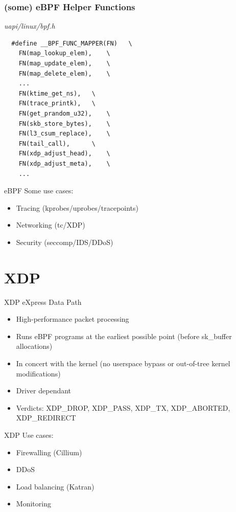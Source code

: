 \documentclass{beamer}
\begin{document}
\begin{frame}[fragile]
  \frametitle{(some) eBPF Helper Functions}
  \textit{uapi/linux/bpf.h~}
  \begin{verbatim}
  #define __BPF_FUNC_MAPPER(FN)   \
    FN(map_lookup_elem),    \
    FN(map_update_elem),    \
    FN(map_delete_elem),    \
    ...
    FN(ktime_get_ns),   \
    FN(trace_printk),   \
    FN(get_prandom_u32),    \
    FN(skb_store_bytes),    \
    FN(l3_csum_replace),    \
    FN(tail_call),      \
    FN(xdp_adjust_head),    \
    FN(xdp_adjust_meta),    \
    ...
\end{verbatim}
\end{frame}

\begin{frame}{eBPF}
  Some use cases:
  \begin{itemize}
    \item Tracing (kprobes/uprobes/tracepoints)\footnotemark
    \item Networking (tc/XDP)
    \item Security (seccomp/IDS/DDoS)
  \end{itemize}
\end{frame}

\section{XDP}
\begin{frame}{XDP}
  eXpress Data Path
  \begin{itemize}
    \item High-performance packet processing
    \item Runs eBPF programs at the earliest possible point (before sk\_buffer allocations)
    \item In concert with the kernel (no userspace bypass or out-of-tree kernel modifications)
    \item Driver dependant
    \item Verdicts: XDP\_DROP, XDP\_PASS, XDP\_TX, XDP\_ABORTED, XDP\_REDIRECT
  \end{itemize}
\end{frame}

\begin{frame}{XDP}
  Use cases:
  \begin{itemize}
    \item Firewalling (Cillium\footnotemark[1])
    \item DDoS
    \item Load balancing (Katran\footnotemark[2])
    \item Monitoring
  \end{itemize}
  \footnotetext[1]{\tiny\url{https://cilium.io/}}
\end{frame}
\end{document}
